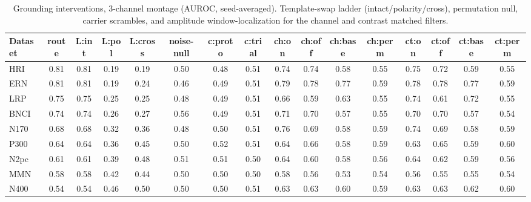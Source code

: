 \begin{table}[t]
\centering
\scriptsize
\setlength{\tabcolsep}{3pt}
\caption{Grounding interventions, 3-channel montage (AUROC, seed-averaged). Template-swap ladder (intact/polarity/cross), permutation null, carrier scrambles, and amplitude window-localization for the channel and contrast matched filters.}
\label{tab:grounding-3}
\begin{tabular}{lccccccccccccccc}
\toprule
Dataset & route & L:int & L:pol & L:cross & noise-null & c:proto & c:trial & ch:on & ch:off & ch:base & ch:perm & ct:on & ct:off & ct:base & ct:perm \\
\midrule
HRI & 0.81 & 0.81 & 0.19 & 0.19 & 0.50 & 0.48 & 0.51 & 0.74 & 0.74 & 0.58 & 0.55 & 0.75 & 0.72 & 0.59 & 0.55 \\
ERN & 0.81 & 0.81 & 0.19 & 0.24 & 0.46 & 0.49 & 0.51 & 0.79 & 0.78 & 0.77 & 0.59 & 0.78 & 0.78 & 0.77 & 0.59 \\
LRP & 0.75 & 0.75 & 0.25 & 0.25 & 0.48 & 0.49 & 0.51 & 0.66 & 0.59 & 0.63 & 0.55 & 0.74 & 0.61 & 0.72 & 0.55 \\
BNCI & 0.74 & 0.74 & 0.26 & 0.27 & 0.56 & 0.49 & 0.51 & 0.71 & 0.70 & 0.57 & 0.55 & 0.70 & 0.70 & 0.57 & 0.54 \\
N170 & 0.68 & 0.68 & 0.32 & 0.36 & 0.48 & 0.50 & 0.51 & 0.76 & 0.69 & 0.58 & 0.59 & 0.74 & 0.69 & 0.58 & 0.59 \\
P300 & 0.64 & 0.64 & 0.36 & 0.45 & 0.50 & 0.52 & 0.51 & 0.64 & 0.66 & 0.58 & 0.59 & 0.63 & 0.65 & 0.59 & 0.60 \\
N2pc & 0.61 & 0.61 & 0.39 & 0.48 & 0.51 & 0.51 & 0.50 & 0.64 & 0.60 & 0.58 & 0.56 & 0.64 & 0.62 & 0.59 & 0.56 \\
MMN & 0.58 & 0.58 & 0.42 & 0.44 & 0.50 & 0.50 & 0.50 & 0.58 & 0.56 & 0.53 & 0.54 & 0.56 & 0.55 & 0.55 & 0.54 \\
N400 & 0.54 & 0.54 & 0.46 & 0.50 & 0.50 & 0.50 & 0.51 & 0.63 & 0.63 & 0.60 & 0.59 & 0.63 & 0.63 & 0.62 & 0.60 \\
\bottomrule
\end{tabular}
\end{table}
